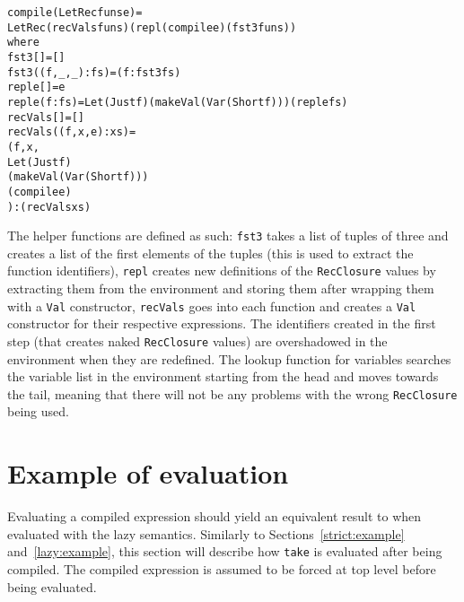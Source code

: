 \begin{alltt}
  compile (LetRec funs e) =
    LetRec (recVals funs) (repl (compile e) (fst3 funs))
    where
      fst3 []           = []
      fst3 ((f,_,_):fs) = (f:fst3 fs)
      repl e []     = e
      repl e (f:fs) = Let (Just f) (makeVal (Var (Short f))) (repl e fs)
      recVals []           = []
      recVals ((f,x,e):xs) =
        (f,x,
         Let (Just f)
         (makeVal (Var (Short f)))
         (compile e)
        ):(recVals xs)
\end{alltt}

\noindent The helper functions are defined as such: \texttt{fst3} takes a list
of tuples of three and creates a list of the first elements of the tuples (this
is used to extract the function identifiers), \texttt{repl} creates new
definitions of the \texttt{RecClosure} values by extracting them from the
environment and storing them after wrapping them with a \texttt{Val}
constructor, \texttt{recVals} goes into each function and creates a \texttt{Val}
constructor for their respective expressions.
The identifiers created in the first step (that creates naked
\texttt{RecClosure} values) are
overshadowed in the environment when they are redefined. The lookup function
for variables searches the variable list in the environment starting from the
head and moves towards the tail, meaning that there will not be any problems
with the wrong \texttt{RecClosure} being used.

\section{Example of evaluation}
\label{com:example}
Evaluating a compiled expression should yield an equivalent result to when
evaluated with the lazy semantics. Similarly to Sections~\ref{strict:example}
and~\ref{lazy:example}, this section will describe how \texttt{take}
is evaluated after being compiled. The compiled expression is assumed to be
forced at top level before being evaluated.


